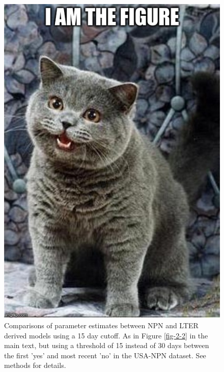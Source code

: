 \newpage
\begin{figure}
	\centering
	\includegraphics[scale=0.5]{images/figure_filler.jpg}
	\caption[Comparisons of parameter estimates between NPN and LTER derived models using a 15 day cutoff]{Comparisons of parameter estimates between NPN and LTER derived models using a 15 day cutoff. As in Figure \ref{fig-2-2} in the main text, but using a threshold of 15 instead of 30 days between the first 'yes' and most recent 'no' in the USA-NPN dataset. See methods for details. } \label{fig-a-2}
\end{figure}

\newpage


